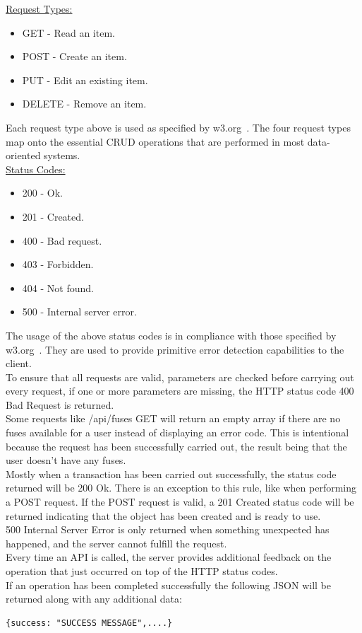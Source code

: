 \documentclass[preprint,12pt,3p]{elsarticle}
\begin{document}
\underline{Request Types:}
\begin{itemize}
\item GET - Read an item.
\item POST - Create an item.
\item PUT - Edit an existing item.
\item DELETE - Remove an item.
\end{itemize}

Each request type above is used as specified by w3.org~\cite{w3}. The four request types map onto the essential CRUD operations that are performed in most data-oriented systems.\\

\underline{Status Codes:}
\begin{itemize}
\item 200 - Ok.
\item 201 - Created.
\item 400 - Bad request.
\item 403 - Forbidden.
\item 404 - Not found.
\item 500 - Internal server error.
\end{itemize}

The usage of the above status codes is in compliance with those specified by w3.org~\cite{w3}. They are used to provide primitive error detection capabilities to the client.\\
To ensure that all requests are valid, parameters are checked before carrying out every request, if one or more parameters are missing, the HTTP status code 400 Bad Request is returned.\\
Some requests like /api/fuses GET will return an empty array if there are no fuses available for a user instead of displaying an error code. This is intentional because the request has been successfully carried out, the result being that the user doesn't have any fuses.\\
Mostly when a transaction has been carried out successfully, the status code returned will be 200 Ok. There is an exception to this rule, like when performing a POST request. If the POST request is valid, a 201 Created status code will be returned indicating that the object has been created and is ready to use.\\
500 Internal Server Error is only returned when something unexpected has happened, and the server cannot fulfill the request.\\
Every time an API is called, the server provides additional feedback on the operation that just occurred on top of the HTTP status codes.\\
If an operation has been completed successfully the following JSON will be returned along with any additional data:\\[5pt]
\begin{verbatim}
{success: "SUCCESS MESSAGE",....}
\end{verbatim}
\end{document}
